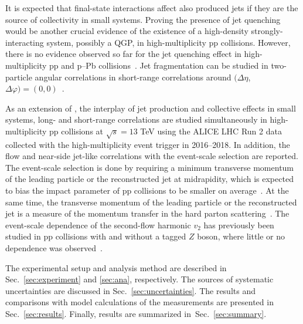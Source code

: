 It is expected that final-state interactions affect also produced jets if they are the source of collectivity in small systems. Proving the presence of jet quenching~\cite{Gyulassy:1990ye,Wang:1991xy} would be another crucial evidence of the existence of a high-density strongly-interacting system, possibly a QGP, in high-multiplicity pp collisions. However, there is no evidence observed so far for the jet quenching effect in high-multiplicity pp and p--Pb collisions~\cite{Khachatryan:2016odn,Adam:2016jfp,Adam:2016dau,Acharya:2017okq}. Jet fragmentation can be studied in two-particle angular correlations in short-range correlations around $(\Delta\eta$, $\Delta\varphi)=(0,0)$~\cite{Adam:2016tsv}.  

As an extension of \cite{ALICE:2021nir}, the interplay of jet production and collective effects in small systems, long- and short-range correlations are studied simultaneously in high-multiplicity pp collisions at $\sqrt{s} =13$ TeV using the ALICE LHC Run 2 data collected with the high-multiplicity event trigger in 2016--2018. 
In addition, the flow and near-side jet-like correlations with the event-scale selection are reported. The event-scale selection is done by requiring a minimum transverse momentum of the leading particle or the reconstructed jet at midrapidity, which is expected to bias the impact parameter of pp collisions to be smaller on average~\cite{Sjostrand:1986ep,Frankfurt:2010ea}. At the same time, the transverse momentum of the leading particle or the reconstructed jet is a measure of the momentum transfer in the hard parton scattering~\cite{Chatrchyan:2012tt,Chatrchyan:2011id}. The event-scale dependence of the second-flow harmonic $v_{2}$ has previously been studied in pp collisions with and without a tagged $Z$ boson, where little or no dependence was observed~\cite{Aaboud:2019mcw}.

The experimental setup and analysis method are described in Sec.~\ref{sec:experiment} and \ref{sec:ana}, respectively. The sources of systematic uncertainties are discussed in Sec.~\ref{sec:uncertainties}. The results and comparisons with model calculations of the measurements are presented in Sec.~\ref{sec:results}. Finally, results are summarized in~Sec.~\ref{sec:summary}.

 